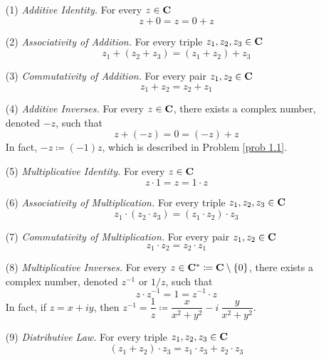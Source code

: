 \vspace*{1em}

\begin{proposition}\label{cafield}\hfill
\begin{itemize}
\item[(1)] \emph{Additive Identity.} For every $z \in \mathbf C$
\[z + 0 = z = 0 + z\]
\item[(2)] \emph{Associativity of Addition.} For every triple $z_1,z_2,z_3 \in \mathbf C$
\[z_1 + (z_2 + z_3) = (z_1 + z_2) + z_3\]
\item[(3)] \emph{Commutativity of Addition.} For every pair $z_1,z_2 \in \mathbf C$
\[z_1 + z_2 = z_2 + z_1\]
\item[(4)] \emph{Additive Inverses.} For every $z \in \mathbf C$, there exists a complex number, denoted $-z$, such that
\[z + (-z) = 0 = (-z) + z\]
In fact, $-z \coloneqq (-1)z$, which is described in Problem \ref{prob 1.1}.
\item[(5)] \emph{Multiplicative Identity.} For every $z \in \mathbf C$
\[z \cdot 1 = z = 1 \cdot z\]
\item[(6)] \emph{Associativity of Multiplication.} For every triple $z_1,z_2,z_3 \in \mathbf C$
\[z_1 \cdot (z_2 \cdot z_3) = (z_1 \cdot z_2) \cdot z_3\]
\item[(7)] \emph{Commutativity of Multiplication.} For every pair $z_1,z_2 \in \mathbf C$
\[z_1\cdot z_2 = z_2\cdot z_1\]
\item[(8)] \emph{Multiplicative Inverses.} For every $z \in \mathbf C^* \coloneqq \mathbf C\setminus\left\{0\right\}$, there exists a complex number, denoted $z^{-1}$ or $1/z$, such that
\[z \cdot z^{-1} = 1 = z^{-1} \cdot z\]
In fact, if $z =  x + iy$, then $z^{-1} = \dfrac{1}{z} \coloneqq \dfrac{x}{x^2 + y^2} - i\ \dfrac{y}{x^2 + y^2}$.
\item[(9)] \emph{Distributive Law.} For every triple $z_1,z_2,z_3 \in \mathbf C$
\[(z_1 + z_2)\cdot z_3 = z_1\cdot z_3 + z_2\cdot z_3\]
\end{itemize}
\end{proposition}
